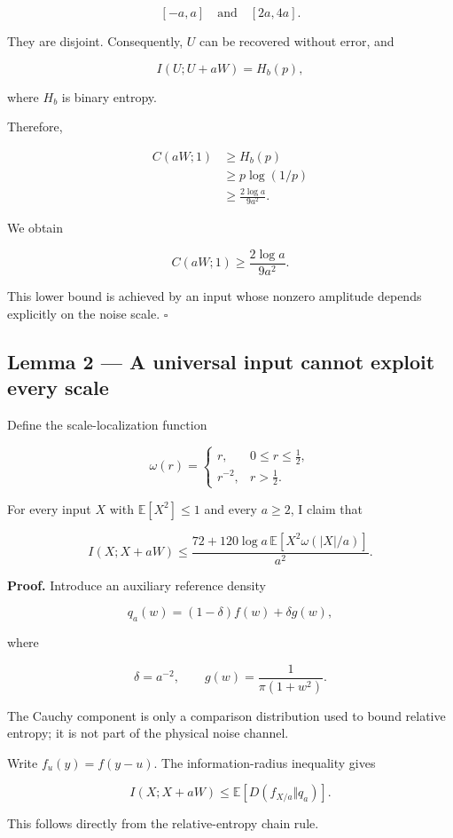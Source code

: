 \documentclass[11pt]{article}
\begin{document}
\[
[-a,a]\quad\text{and}\quad[2a,4a].
\]

They are disjoint. Consequently, \(U\) can be recovered without error, and

\[
I(U;U+aW)=H_b(p),
\]

where \(H_b\) is binary entropy.

Therefore,

\[
\begin{aligned}
C(aW;1)
&\geq H_b(p)\\
&\geq p\log(1/p)\\
&\geq\frac{2\log a}{9a^2}.
\end{aligned}
\]

We obtain

\[
\boxed{C(aW;1)\geq\frac{2\log a}{9a^2}.}
\]

This lower bound is achieved by an input whose nonzero amplitude depends explicitly on the noise scale. \(\square\)

\subsection{Lemma 2 --- A universal input cannot exploit every scale}

Define the scale-localization function

\[
\omega(r)=
\begin{cases}
r,&0\leq r\leq\frac12,\\
r^{-2},&r>\frac12.
\end{cases}
\]

For every input \(X\) with \(\mathbb E[X^2]\leq1\) and every \(a\geq2\), I claim that

\[
\boxed{
I(X;X+aW)
\leq
\frac{
72+120\log a\,
\mathbb E[X^2\omega(|X|/a)]
}{a^2}.
}
\]

\textbf{Proof.} Introduce an auxiliary reference density

\[
q_a(w)=(1-\delta)f(w)+\delta g(w),
\]

where

\[
\delta=a^{-2},
\qquad
g(w)=\frac1{\pi(1+w^2)}.
\]

The Cauchy component is only a comparison distribution used to bound relative entropy; it is not part of the physical noise channel.

Write \(f_u(y)=f(y-u)\). The information-radius inequality gives

\[
I(X;X+aW)
\leq
\mathbb E\left[D(f_{X/a}\Vert q_a)\right].
\]

This follows directly from the relative-entropy chain rule.
\end{document}
